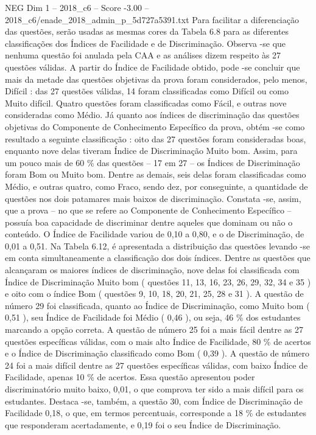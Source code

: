 \begin{textsample}{NEG Dim 1 – 2018\_c6 – Score -3.00 – 2018\_c6/enade\_2018\_admin\_p\_5d727a5391.txt}
Para facilitar a diferenciação das questões, serão usadas as mesmas cores da Tabela 6.8 para as diferentes classificações dos Índices de Facilidade e de Discriminação.
Observa -se que nenhuma questão foi anulada pela CAA e as análises dizem respeito às 27 questões válidas.
A partir do Índice de Facilidade obtido, pode -se concluir que mais da metade das questões objetivas da prova foram considerados, pelo menos, Difícil : das 27 questões válidas, 14 foram classificadas como Difícil ou como Muito difícil.
Quatro questões foram classificadas como Fácil, e outras nove consideradas como Médio.
Já quanto aos índices de discriminação das questões objetivas do Componente de Conhecimento Específico da prova, obtém -se como resultado a seguinte classificação : oito das 27 questões foram consideradas boas, enquanto nove delas tiveram Índice de Discriminação Muito bom.
Assim, para um pouco mais de 60 \% das questões – 17 em 27 – os Índices de Discriminação foram Bom ou Muito bom.
Dentre as demais, seis delas foram classificadas como Médio, e outras quatro, como Fraco, sendo dez, por conseguinte, a quantidade de questões nos dois patamares mais baixos de discriminação.
Constata -se, assim, que a prova – no que se refere ao Componente de Conhecimento Específico – possuía boa capacidade de discriminar dentre aqueles que dominam ou não o conteúdo.
O Índice de Facilidade variou de 0,10 a 0,80, e o de Discriminação, de 0,01 a 0,51.
Na Tabela 6.12, é apresentada a distribuição das questões levando -se em conta simultaneamente a classificação dos dois índices.
Dentre as questões que alcançaram os maiores índices de discriminação, nove delas foi classificada com Índice de Discriminação Muito bom ( questões 11, 13, 16, 23, 26, 29, 32, 34 e 35 ) e oito com o índice Bom ( questões 9, 10, 18, 20, 21, 25, 28 e 31 ).
A questão de número 29 foi classificada, quanto ao Índice de Discriminação, como Muito bom ( 0,51 ), seu Índice de Facilidade foi Médio ( 0,46 ), ou seja, 46 \% dos estudantes marcando a opção correta.
A questão de número 25 foi a mais fácil dentre as 27 questões específicas válidas, com o mais alto Índice de Facilidade, 80 \% de acertos e o Índice de Discriminação classificado como Bom ( 0,39 ).
A questão de número 24 foi a mais difícil dentre as 27 questões específicas válidas, com baixo Índice de Facilidade, apenas 10 \% de acertos.
Essa questão apresentou poder discriminatório muito baixo, 0,01, o que comprova ter sido a mais difícil para os estudantes.
Destaca -se, também, a questão 30, com Índice de Discriminação de Facilidade 0,18, o que, em termos percentuais, corresponde a 18 \% de estudantes que responderam acertadamente, e 0,19 foi o seu Índice de Discriminação.

\end{textsample}
